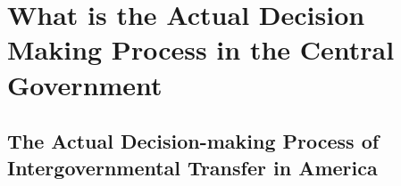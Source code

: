 
\chapter{What is the Actual Decision Making Process in the Central Government}




\section{The Actual Decision-making Process of Intergovernmental Transfer in America}



